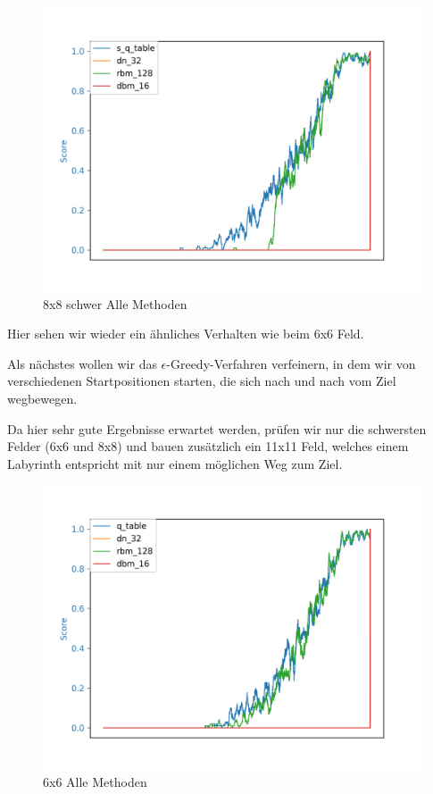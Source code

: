 \begin{figure}[H]
\centering
\includegraphics[width=\textwidth]{Figures/all_8x8_s_q_table_dn_32_rbm_128_dbm_16.png}
\caption{8x8 schwer Alle Methoden}
\label{all_8}
\end{figure}

Hier sehen wir wieder ein ähnliches Verhalten wie beim 6x6 Feld.

Als nächstes wollen wir das $\epsilon$-Greedy-Verfahren verfeinern, in dem wir von verschiedenen Startpositionen starten, die sich nach und nach vom Ziel wegbewegen.

Da hier sehr gute Ergebnisse erwartet werden, prüfen wir nur die schwersten Felder (6x6 und 8x8) und bauen zusätzlich ein 11x11 Feld, welches einem Labyrinth entspricht mit nur einem möglichen Weg zum Ziel.

\begin{figure}[H]
\centering
\includegraphics[width=\textwidth]{Figures/all_6x6_q_table_dn_32_rbm_128_dbm_16.png}
\caption{6x6 Alle Methoden}
\label{all_12}
\end{figure}

